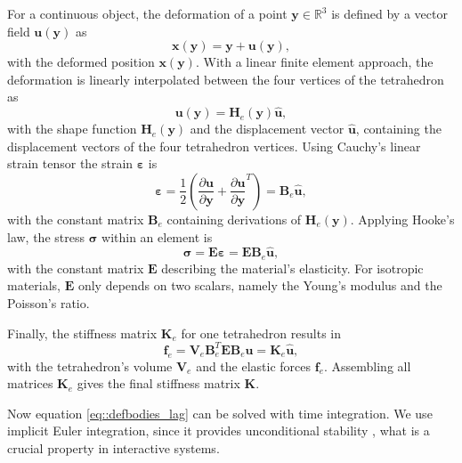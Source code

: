 For a continuous object, the deformation of a point $\mathbf y \in \mathbb R^3$ is defined by a vector field $\mathbf u(\mathbf y)$ as
\begin{equation}
\mathbf {x(y)=y+u(y)},
\end{equation}
with the deformed position $\mathbf {x(y)}$. With a linear finite element approach, the deformation is linearly interpolated between the four vertices of the tetrahedron as
\begin{equation}
\mathbf {u(y)}=\mathbf H_e(\mathbf y) \hat {\mathbf u},
\end{equation}
with the shape function $\mathbf H_e(\mathbf y)$ and the displacement vector $\hat {\mathbf u}$, containing the displacement vectors of the four tetrahedron vertices.
Using Cauchy's linear strain tensor \cite{COOK1994} the strain $\boldsymbol\varepsilon$ is
\begin{equation}
\boldsymbol \varepsilon=\frac{1}{2} (\frac{\partial \mathbf u}{\partial \mathbf y}+\frac{\partial \mathbf u}{\partial \mathbf y}^T)=\mathbf B_e  \hat{\mathbf u},
\end{equation}
with the constant matrix $\mathbf B_e$ containing derivations of $\mathbf H_e(\mathbf y)$. Applying Hooke's law, the stress $\boldsymbol \sigma$ within an element is
\begin{equation}
\boldsymbol \sigma=\mathbf E \boldsymbol\varepsilon=\mathbf E \mathbf B_e \hat{\mathbf u},
\end{equation}
with the constant matrix $\mathbf E$ describing the material's elasticity. For isotropic materials, $\mathbf E$ only depends on two scalars, namely the Young's modulus and the Poisson's ratio.

Finally, the stiffness matrix $\mathbf K_e$ for one tetrahedron results in
\begin{equation}
\mathbf f_e=\mathbf V_e \mathbf B_e^T \mathbf E \mathbf B_e \hat{\mathbf u}=\mathbf K_e \hat{\mathbf u},
\end{equation}
with the tetrahedron's volume $\mathbf V_e$ and the elastic forces $\mathbf f_e$. Assembling all matrices $\mathbf K_e$ gives the final stiffness matrix $\mathbf K$.

Now equation \ref{eq::defbodies_lag} can be solved with time integration. We use implicit Euler integration, since it provides unconditional stability \cite{WEBER2011}, what is a crucial property in interactive systems. %

